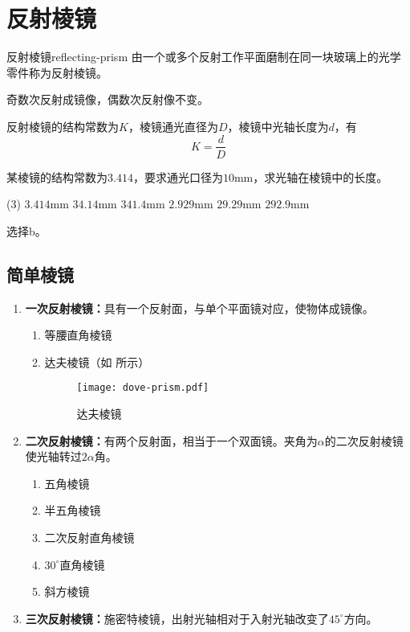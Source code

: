 \documentclass[cn,10pt,chinesefont=founder,math=mtpro2,cite=super,toc=onecol,twoside,openany]{elegantbook}
\begin{document}
\section{反射棱镜}
\label{sect:reflecting-prism}

\begin{definition}{反射棱镜}{reflecting-prism}
	由一个或多个反射工作平面磨制在同一块玻璃上的光学零件称为反射棱镜。
\end{definition}

\begin{property}
	奇数次反射成镜像，偶数次反射像不变。
\end{property}

反射棱镜的结构常数为$K$，棱镜通光直径为$D$，棱镜中光轴长度为$d$，有
\begin{equation}
K=\frac{d}{D}
\end{equation}

\begin{problem}
	某棱镜的结构常数为$3.414$，要求通光口径为$10\mathrm{mm}$，求光轴在棱镜中的长度。
	\begin{tasks}(3)
		\task $3.414\mathrm{mm}$
		\task $34.14\mathrm{mm}$
		\task $341.4\mathrm{mm}$
		\task $2.929\mathrm{mm}$
		\task $29.29\mathrm{mm}$
		\task $292.9\mathrm{mm}$
	\end{tasks}
\end{problem}
\begin{solution}
	选择b。
\end{solution}

\subsection{简单棱镜}

\begin{enumerate}
	\item \textbf{一次反射棱镜：}具有一个反射面，与单个平面镜对应，使物体成镜像。
	\begin{enumerate}
		\item 等腰直角棱镜
		\item 达夫棱镜（如 所示）
		\begin{figure}[htbp]
			\centering
			\texttt{[image: dove-prism.pdf]}
			\caption{达夫棱镜}
			\label{fig:dove-prism}
		\end{figure}
	\end{enumerate}
	\item \textbf{二次反射棱镜：}有两个反射面，相当于一个双面镜。夹角为$\alpha$的二次反射棱镜使光轴转过$2\alpha$角。
	\begin{enumerate}
		\item 五角棱镜
		\item 半五角棱镜
		\item 二次反射直角棱镜
		\item $30^{\circ}$直角棱镜
		\item 斜方棱镜
	\end{enumerate}
	\item \textbf{三次反射棱镜：}施密特棱镜，出射光轴相对于入射光轴改变了$45^{\circ}$方向。
\end{enumerate}
\end{document}
